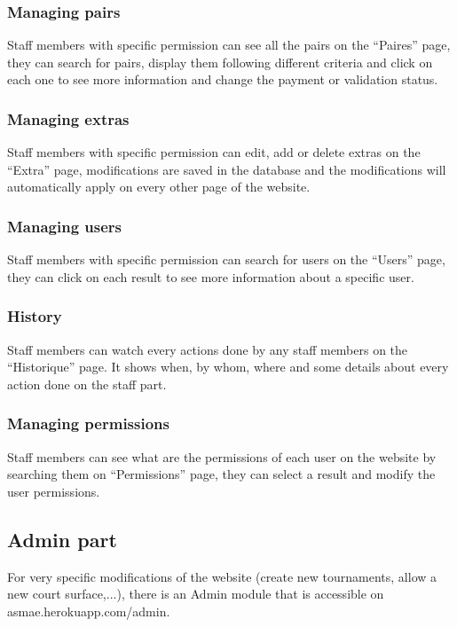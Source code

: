 \subsubsection{Managing pairs}

Staff members with specific permission can see all the pairs on the \enquote{Paires} page, they can search for pairs, display them following different criteria and click on each one to see more information and change the payment or validation status.

\subsubsection{Managing extras}

Staff members with specific permission can edit, add or delete extras on the \enquote{Extra} page, modifications are saved in the database and the modifications will automatically apply on every other page of the website.

\subsubsection{Managing users}

Staff members with specific permission can search for users on the \enquote{Users} page, they can click on each result to see more information about a specific user.

\subsubsection{History}

Staff members can watch every actions done by any staff members on the \enquote{Historique} page. It shows when, by whom, where and some details about every action done on the staff part.

\subsubsection{Managing permissions}

Staff members can see what are the permissions of each user on the website by searching them on \enquote{Permissions} page, they can select a result and modify the user permissions.

\subsection{Admin part}

For very specific modifications of the website (create new tournaments, allow a new court surface,...), there is an Admin module that is accessible on asmae.herokuapp.com/admin.
